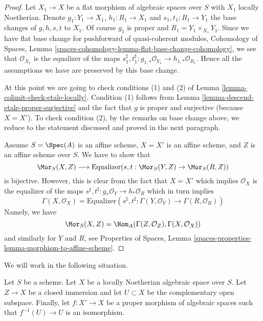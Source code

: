 \begin{proof}
\medskip\noindent
Let $X_1 \to X$ be a flat morphism of algebraic spaces over $S$ with $X_1$
locally Noetherian. Denote $g_1 : Y_1 \to X_1$, $h_1 : R_1 \to X_1$ and
$s_1, t_1 : R_1 \to Y_1$ the base changes of $g, h, s, t$ to $X_1$.
Of course $g_1$ is proper and $R_1 = Y_1 \times_{X_1} Y_1$.
Since we have flat base change for pushforward of quasi-coherent modules,
Cohomology of Spaces, Lemma
\ref{spaces-cohomology-lemma-flat-base-change-cohomology}, we see that
$\mathcal{O}_{X_1}$ is the equalizer of the maps
$s_1^\sharp, t_1^\sharp : g_{1, *}\mathcal{O}_{Y_1} \to
h_{1, *}\mathcal{O}_{R_1}$. Hence all the assumptions we have
are preserved by this base change.

\medskip\noindent
At this point we are going to check conditions (1) and (2) of
Lemma \ref{lemma-colimit-check-etale-locally}. Condition (1)
follows from Lemma \ref{lemma-descend-etale-proper-surjective}
and the fact that $g$ is proper and surjective (because $X = X'$).
To check condition (2), by the remarks on base change above,
we reduce to the statement discussed and proved in the next paragraph.

\medskip\noindent
Assume $S = \Spec(A)$ is an affine scheme, $X = X'$ is an affine scheme, and
$Z$ is an affine scheme over $S$. We have to show that
$$
\Mor_S(X, Z) \longrightarrow
\text{Equalizer}(s, t : \Mor_S(Y, Z) \to \Mor_S(R, Z))
$$
is bijective. However, this is clear from the fact that $X = X'$
which implies $\mathcal{O}_X$ is the equalizer of the maps
$s^\sharp, t^\sharp : g_*\mathcal{O}_Y \to h_*\mathcal{O}_R$
which in turn implies
$$
\Gamma(X, \mathcal{O}_X) =
\text{Equalizer}\left(
s^\sharp, t^\sharp : \Gamma(Y, \mathcal{O}_Y) \to
\Gamma(R, \mathcal{O}_R)
\right)
$$
Namely, we have
$$
\Mor_S(X, Z) = \Hom_A(\Gamma(Z, \mathcal{O}_Z), \Gamma(X, \mathcal{O}_X))
$$
and similarly for $Y$ and $R$, see Properties of Spaces, Lemma
\ref{spaces-properties-lemma-morphism-to-affine-scheme}.
\end{proof}

\noindent
We will work in the following situation.

\begin{situation}
\label{situation-coequalizer-glue}
Let $S$ be a scheme. Let $X$ be a locally Noetherian algebraic space over $S$.
Let $Z \to X$ be a closed immersion and let $U \subset X$ be the complementary
open subspace. Finally, let $f : X' \to X$ be a proper morphism of algebraic
spaces such that $f^{-1}(U) \to U$ is an isomorphism.
\end{situation}

